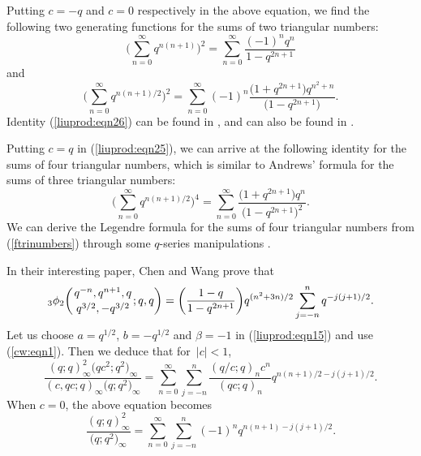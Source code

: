 \documentclass[pdftex]{sigma}
\numberwithin{equation}{section}
\begin{document}
Putting $c=-q$ and $c=0$ respectively in the above equation, we find the following two generating functions for the sums of two triangular numbers:
\begin{equation} \label{liuprod:eqn26}
	\Biggl(\sum_{n=0}^\infty q^{n(n+1)}\Biggr)^2
	=\sum_{n=0}^\infty \frac{(-1)^n q^n}{1-q^{2n+1}}
\end{equation}
and
\begin{equation*}%
	\Biggl(\sum_{n=0}^\infty q^{n(n+1)/2}\Biggr)^2
	=\sum_{n=0}^\infty (-1)^n \frac{\bigl(1+q^{2n+1}\bigr) q^{n^2+n}}{\bigl(1-q^{2n+1}\bigr)}.
\end{equation*}
Identity (\ref{liuprod:eqn26}) can be found in \cite[p.~397, Entry 18.2.4]{AndrewsBerndt2005}, and can also be found in
\cite[Theorem~3.8]{Liu2020HRjournal}.

Putting $c=q$ in (\ref{liuprod:eqn25}), we can arrive at the following identity for the sums of four triangular numbers, which is similar to Andrews' formula for the sums of three triangular numbers:
\begin{equation}\label{ftrinumbers}
\biggl(\sum_{n=0}^\infty q^{n(n+1)/2}\biggr)^4 =\sum_{n=0}^\infty \frac{\bigl(1+q^{2n+1}\bigr)q^n}{\bigl(1-q^{2n+1}\bigr)^2} .
\end{equation}
We can derive the Legendre formula for the sums of four triangular numbers from (\ref{ftrinumbers}) through some $q$-series manipulations \cite[Entry~18.2.5]{AndrewsBerndt2005}.

In their interesting paper, Chen and Wang \cite[equation~(3.43)]{ChenWang2020} prove that
\begin{equation}\label{cw:eqn1}
{_3\phi_2}\biggl({{q^{-n}, q^{n+1}, q}\atop{q^{3/2}, -q^{3/2}}}; q, q\biggr)
=\biggl(\frac{1-q}{1-q^{2n+1}}\biggr) q^{(n^2+3n)/2}
\sum_{j=-n}^n q^{-j(j+1)/2}.
\end{equation}
Let us choose $a=q^{1/2}$, $b=-q^{1/2}$ and $\beta=-1$ in (\ref{liuprod:eqn15}) and use (\ref{cw:eqn1}). Then we deduce that for~${|c|<1}$,
\begin{equation*}%
\frac{(q; q)_\infty^2 \bigl(qc^2; q^2\bigr)_\infty}{(c, qc; q)_\infty \bigl(q; q^2\bigr)_\infty}
=\sum_{n=0}^\infty \sum_{j=-n}^n \frac{(q/c; q)_n c^n}{(qc; q)_{n}}
q^{n(n+1)/2-j(j+1)/2}.
\end{equation*}
When $c=0$, the above equation becomes
\begin{equation*}%
	\frac{(q; q)_\infty^2 }{\bigl(q; q^2\bigr)_\infty}
	=\sum_{n=0}^\infty \sum_{j=-n}^n {(-1)^n} q^{n(n+1)-j(j+1)/2}.
\end{equation*}
\end{document}
